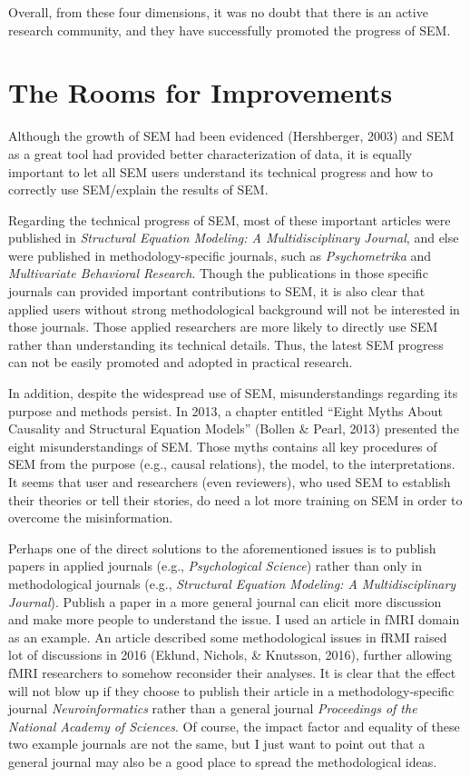 \documentclass[jou]{apa6}
\theoremstyle{definition}
\theoremstyle{definition}
\theoremstyle{definition}
\theoremstyle{remark}
\begin{document}
Overall, from these four dimensions, it was no doubt that there is an
active research community, and they have successfully promoted the
progress of SEM.

\hypertarget{the-rooms-for-improvements}{%
\section{The Rooms for Improvements}\label{the-rooms-for-improvements}}

\noindent Although the growth of SEM had been evidenced (Hershberger,
2003) and SEM as a great tool had provided better characterization of
data, it is equally important to let all SEM users understand its
technical progress and how to correctly use SEM/explain the results of
SEM.

\setlength{\parindent}{4ex}

Regarding the technical progress of SEM, most of these important
articles were published in \emph{Structural Equation Modeling: A
Multidisciplinary Journal}, and else were published in
methodology-specific journals, such as \emph{Psychometrika} and
\emph{Multivariate Behavioral Research}. Though the publications in
those specific journals can provided important contributions to SEM, it
is also clear that applied users without strong methodological
background will not be interested in those journals. Those applied
researchers are more likely to directly use SEM rather than
understanding its technical details. Thus, the latest SEM progress can
not be easily promoted and adopted in practical research.

In addition, despite the widespread use of SEM, misunderstandings
regarding its purpose and methods persist. In 2013, a chapter entitled
\enquote{Eight Myths About Causality and Structural Equation Models}
(Bollen \& Pearl, 2013) presented the eight misunderstandings of SEM.
Those myths contains all key procedures of SEM from the purpose (e.g.,
causal relations), the model, to the interpretations. It seems that user
and researchers (even reviewers), who used SEM to establish their
theories or tell their stories, do need a lot more training on SEM in
order to overcome the misinformation.

Perhaps one of the direct solutions to the aforementioned issues is to
publish papers in applied journals (e.g., \emph{ Psychological Science})
rather than only in methodological journals (e.g., \emph{Structural
Equation Modeling: A Multidisciplinary Journal}). Publish a paper in a
more general journal can elicit more discussion and make more people to
understand the issue. I used an article in fMRI domain as an example. An
article described some methodological issues in fRMI raised lot of
discussions in 2016 (Eklund, Nichols, \& Knutsson, 2016), further
allowing fMRI researchers to somehow reconsider their analyses. It is
clear that the effect will not blow up if they choose to publish their
article in a methodology-specific journal \emph{Neuroinformatics} rather
than a general journal \emph{Proceedings of the National Academy of
Sciences}. Of course, the impact factor and equality of these two
example journals are not the same, but I just want to point out that a
general journal may also be a good place to spread the methodological
ideas.
\end{document}
